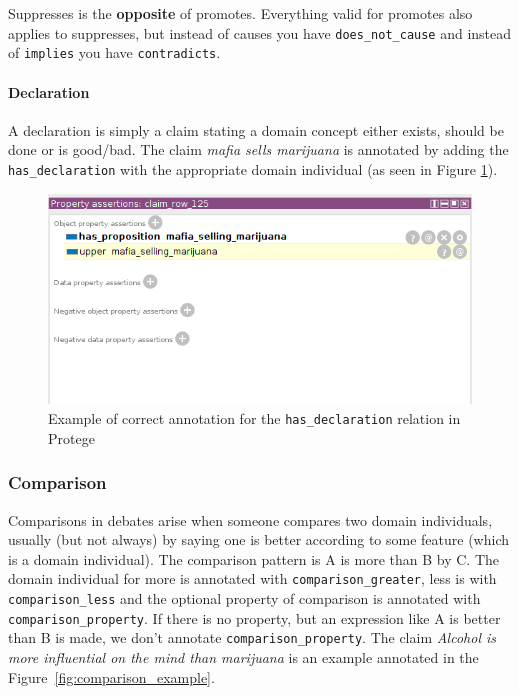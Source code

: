 Suppresses is the \textbf{opposite} of promotes. Everything valid for promotes
also applies to suppresses, but instead of causes you have
\texttt{does\_not\_cause} and instead of \texttt{implies} you have \texttt{contradicts}.

\paragraph{Declaration}

A declaration is simply a claim stating a domain concept either exists, should
be done or is good/bad. The claim \textit{mafia sells marijuana} is annotated by adding
the \texttt{has\_declaration} with the appropriate domain individual (as seen in Figure
\ref{fig:declaration_example}). 

\begin{figure}
	\includegraphics[scale=0.8]{has_declaration.png}
	\caption{Example of correct annotation for the \texttt{has\_declaration} relation in Protege}
\label{fig:declaration_example}
\end{figure}

\subsubsection*{Comparison}

Comparisons in debates arise when someone compares two domain individuals,
usually (but not always) by saying one is better according to some feature
(which is a domain individual). The comparison pattern is A is more than B by
C. The domain individual for more is annotated with
\texttt{comparison\_greater}, less is with \texttt{comparison\_less} and the
optional property of comparison is annotated with
\texttt{comparison\_property}. If there is no property, but an expression like
A is better than B is made, we don’t annotate \texttt{comparison\_property}.
The claim \textit{Alcohol is more influential on the mind than marijuana} is an
example annotated in the Figure~\ref{fig:comparison_example}.

